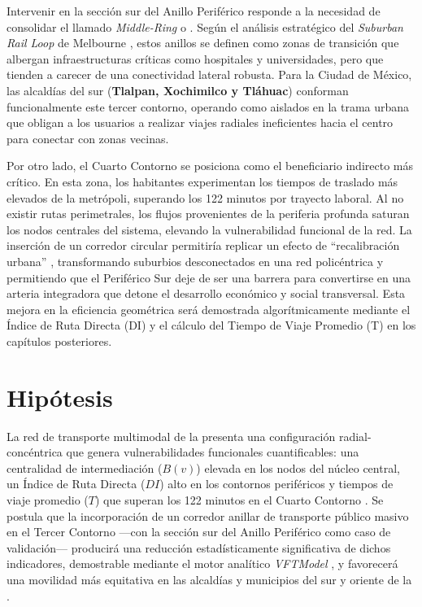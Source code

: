 Intervenir en la sección sur del Anillo Periférico responde a la necesidad de consolidar el llamado \textit{Middle-Ring} o \DIFdelbegin {}\DIFdelend \DIFaddbegin {}\DIFaddend .
Según el análisis estratégico del \textit{Suburban Rail Loop} de Melbourne \parencite{suburbanrailloop2021}, estos anillos se definen 
como zonas de transición que albergan infraestructuras críticas como hospitales y universidades, pero que tienden a carecer de una conectividad
lateral robusta. Para la Ciudad de México, las alcaldías del sur (\textbf{Tlalpan, Xochimilco y Tláhuac}) conforman funcionalmente este tercer contorno,
operando como \DIFdelbegin {}\DIFdelend \DIFaddbegin {}\DIFaddend aislados en la trama urbana que obligan a los usuarios a realizar viajes radiales ineficientes hacia el centro para conectar 
con zonas vecinas.

Por otro lado, el Cuarto Contorno se posiciona como el beneficiario indirecto más crítico. En esta zona, los habitantes experimentan los tiempos de 
traslado más elevados de la metrópoli, superando los 122 minutos por trayecto laboral. Al no existir rutas perimetrales, los flujos provenientes de 
la periferia profunda saturan los nodos centrales del sistema, elevando la vulnerabilidad funcional de la red. La inserción de un corredor circular 
permitiría replicar un efecto de ``recalibración urbana'' \parencite{suburbanrailloop2021}, transformando suburbios desconectados en una red policéntrica 
y permitiendo que el Periférico Sur deje de ser una barrera para convertirse en una arteria integradora que detone el desarrollo económico y social transversal.
Esta mejora en la eficiencia geométrica será demostrada algorítmicamente mediante el Índice de Ruta Directa (DI) y el cálculo del Tiempo de Viaje Promedio (T) 
en los capítulos posteriores.

\section{Hipótesis}
\label{sec:hipotesis}

La red de transporte multimodal de la \zmvm{} presenta una configuración
radial-concéntrica que genera vulnerabilidades funcionales cuantificables: una
centralidad de intermediación ($B(v)$) elevada en los nodos del núcleo central,
un Índice de Ruta Directa ($DI$) alto en los contornos periféricos y tiempos de
viaje promedio ($T$) que superan los 122 minutos en el Cuarto Contorno
\parencite{semovi2020diagnostico}. Se postula que la incorporación de un corredor
anillar de transporte público masivo en el Tercer Contorno ---con la sección sur del
Anillo Periférico como caso de validación--- producirá una reducción estadísticamente
significativa de dichos indicadores, demostrable mediante el motor analítico
\textit{VFTModel} \parencite{cabrera2026VFTModel}, y favorecerá una movilidad
más equitativa en las alcaldías y municipios del sur y oriente de la \zmvm{}.

